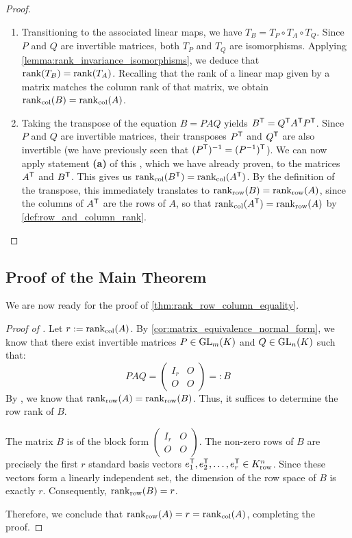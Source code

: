 \begin{proof}
\begin{enumerate}[label=\textbf{(\alph*)}]
    \item Transitioning to the associated linear maps, we have $T_B = T_P \circ T_A \circ T_Q$. Since $P$ and $Q$ are invertible matrices, both $T_P$ and $T_Q$ are isomorphisms. Applying \cref{lemma:rank_invariance_isomorphisms}, we deduce that $\operatorname{rank}(T_B) = \operatorname{rank}(T_A)$. Recalling that the rank of a linear map given by a matrix matches the column rank of that matrix, we obtain $\operatorname{rank}_{\text{col}}(B) = \operatorname{rank}_{\text{col}}(A)$.

    \item Taking the transpose of the equation $B = PAQ$ yields $B^{\mathsf{T}} = Q^{\mathsf{T}} A^{\mathsf{T}} P^{\mathsf{T}}$. Since $P$ and $Q$ are invertible matrices, their transposes $P^{\mathsf{T}}$ and $Q^{\mathsf{T}}$ are also invertible (we have previously seen that $(P^{\mathsf{T}})^{-1} = (P^{-1})^{\mathsf{T}}$). We can now apply statement \textbf{(a)} of this , which we have already proven, to the matrices $A^{\mathsf{T}}$ and $B^{\mathsf{T}}$. This gives us $\operatorname{rank}_{\text{col}}(B^{\mathsf{T}}) = \operatorname{rank}_{\text{col}}(A^{\mathsf{T}})$. By the definition of the transpose, this immediately translates to $\operatorname{rank}_{\text{row}}(B) = \operatorname{rank}_{\text{row}}(A)$, since the columns of $A^{\mathsf{T}}$ are the rows of $A$, so that $\operatorname{rank}_{\text{col}}(A^{\mathsf{T}}) = \operatorname{rank}_{\text{row}}(A)$ by \cref{def:row_and_column_rank}.
\end{enumerate}
\end{proof}

\subsection{Proof of the Main Theorem}

We are now ready for the proof of \cref{thm:rank_row_column_equality}.

\begin{proof}[Proof of ]
Let $r := \operatorname{rank}_{\text{col}}(A)$. By \cref{cor:matrix_equivalence_normal_form}, we know that there exist invertible matrices $P \in \operatorname{GL}_m(K)$ and $Q \in \operatorname{GL}_n(K)$ such that:
\begin{equation*}
    P A Q = \begin{pmatrix} I_r & O \\ O & O \end{pmatrix} =: B
\end{equation*}
By , we know that $\operatorname{rank}_{\text{row}}(A) = \operatorname{rank}_{\text{row}}(B)$. Thus, it suffices to determine the row rank of $B$.

The matrix $B$ is of the block form $\left(\begin{smallmatrix} I_r & O \\ O & O \end{smallmatrix}\right)$. The non-zero rows of $B$ are precisely the first $r$ standard basis vectors $e_1^{\mathsf{T}}, e_2^{\mathsf{T}}, \dots, e_r^{\mathsf{T}} \in K_{\text{row}}^n$. Since these vectors form a linearly independent set, the dimension of the row space of $B$ is exactly $r$. Consequently, $\operatorname{rank}_{\text{row}}(B) = r$.

Therefore, we conclude that $\operatorname{rank}_{\text{row}}(A) = r = \operatorname{rank}_{\text{col}}(A)$, completing the proof.
\end{proof}

